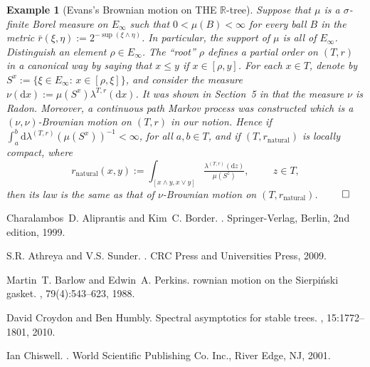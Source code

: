 \documentclass[11pt]{amsart}
\numberwithin{equation}{section}
\newtheorem{example}[definition]{Example}
\begin{document}
{\begin{example}[Evans's Brownian motion on THE ${{\mathbb R}}$-tree]
Suppose that $\mu$ is a $\sigma$-finite Borel measure on $E_\infty$ such that $0<\mu(B)<\infty$ for every ball $B$ in the metric $\bar{r}(\xi,\eta):=2^{-\sup(\xi\wedge\eta)}$. In particular, the support of $\mu$ is all of $E_\infty$.
Distinguish an element $\rho\in E_\infty$. The ``root'' $\rho$ defines a partial order on $(T,r)$ in a canonical way by saying that $x\le y$ if $x\in[\rho,y]$.
For each $x\in T$, denote by $S^x:=\{\xi\in E_\infty:\,x\in[\rho,\xi]\}$, and consider the measure $\nu(\mathrm{d}x):=\mu(S^x)\lambda^{T,r}(\mathrm{d}x)$. It was shown in Section~5 in \cite{Eva00} that the measure $\nu$ is Radon. Moreover, a continuous path Markov process was constructed which is a $(\nu,\nu)$-Brownian motion on $(T,r)$ in our notion.
Hence if $\int^b_a\mathrm{d}\lambda^{(T,r)}(\mu(S^x))^{-1}<\infty$, for all $a,b\in T$, and if $(T,r_{\mathrm{natural}})$ is locally compact, where
\begin{equation}
\label{e:008}
   r_{\mathrm{natural}}(x,y):=\int_{[x\wedge y,x\vee y]}\tfrac{\lambda^{(T,r)}(\mathrm{d}z)}{\mu(S^z)},\hspace{1cm}z\in T,
\end{equation}
then its law is the same as that of {$\nu$}-Brownian motion on $(T,r_{\mathrm{natural}})$.
\hfill$\qed$
\end{example}{\smallskip}


\begin{thebibliography}{DMT96}

Charalambos~D. Aliprantis and Kim~C. Border.
.
\newblock Springer-Verlag, Berlin, 2nd edition, 1999.

S.R. Athreya and V.S. Sunder.
.
\newblock CRC Press and Universities Press, 2009.

Martin~T. Barlow and Edwin~A. Perkins.
rownian motion on the {S}ierpi\'nski gasket.
, 79(4):543--623, 1988.

David Croydon and Ben Humbly.
\newblock Spectral asymptotics for stable trees.
, 15:1772--1801, 2010.

{I}an Chiswell.
.
\newblock World Scientific Publishing Co. Inc., River Edge, NJ, 2001.


\end{thebibliography}}
\end{document}
